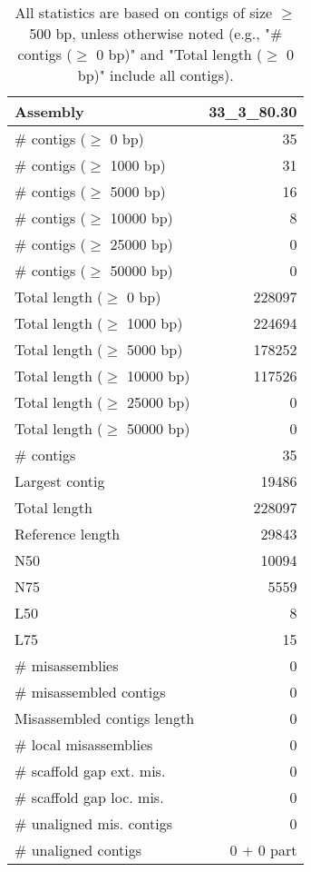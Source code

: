\documentclass[12pt,a4paper]{article}
\begin{document}
\begin{table}[ht]
\begin{center}
\caption{All statistics are based on contigs of size $\geq$ 500 bp, unless otherwise noted (e.g., "\# contigs ($\geq$ 0 bp)" and "Total length ($\geq$ 0 bp)" include all contigs).}
\begin{tabular}{|l*{1}{|r}|}
\hline
Assembly & 33\_3\_80.30 \\ \hline
\# contigs ($\geq$ 0 bp) & 35 \\ \hline
\# contigs ($\geq$ 1000 bp) & 31 \\ \hline
\# contigs ($\geq$ 5000 bp) & 16 \\ \hline
\# contigs ($\geq$ 10000 bp) & 8 \\ \hline
\# contigs ($\geq$ 25000 bp) & 0 \\ \hline
\# contigs ($\geq$ 50000 bp) & 0 \\ \hline
Total length ($\geq$ 0 bp) & 228097 \\ \hline
Total length ($\geq$ 1000 bp) & 224694 \\ \hline
Total length ($\geq$ 5000 bp) & 178252 \\ \hline
Total length ($\geq$ 10000 bp) & 117526 \\ \hline
Total length ($\geq$ 25000 bp) & 0 \\ \hline
Total length ($\geq$ 50000 bp) & 0 \\ \hline
\# contigs & 35 \\ \hline
Largest contig & 19486 \\ \hline
Total length & 228097 \\ \hline
Reference length & 29843 \\ \hline
N50 & 10094 \\ \hline
N75 & 5559 \\ \hline
L50 & 8 \\ \hline
L75 & 15 \\ \hline
\# misassemblies & 0 \\ \hline
\# misassembled contigs & 0 \\ \hline
Misassembled contigs length & 0 \\ \hline
\# local misassemblies & 0 \\ \hline
\# scaffold gap ext. mis. & 0 \\ \hline
\# scaffold gap loc. mis. & 0 \\ \hline
\# unaligned mis. contigs & 0 \\ \hline
\# unaligned contigs & 0 + 0 part \\ \hline

\end{tabular}
\end{center}
\end{table}
\end{document}
